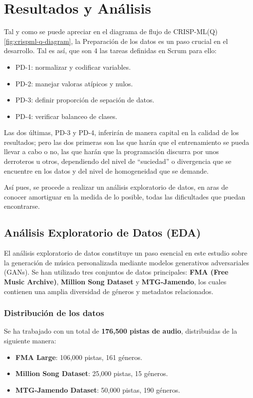\chapter{Resultados y Análisis}

Tal y como se puede apreciar en el diagrama de flujo de CRISP-ML(Q)\ref{fig:crispml-q-diagram}, la Preparación de los datos es un paso crucial en el desarrollo. Tal es así, que son 4 las tareas definidas en Scrum para ello:
\begin{itemize}
    \item PD-1: normalizar y codificar variables.
    \item PD-2: manejar valoras atípicos y nulos.
    \item PD-3: definir proporción de sepación de datos.
    \item PD-4: verificar balanceo de clases.
\end{itemize}

Las dos últimas, PD-3 y PD-4, inferirán de manera capital en la calidad de los resultados; pero las dos primeras son las que harán que el entrenamiento se pueda llevar a cabo o no, las que harán que la programación discurra por unos derroteros u otros, dependiendo del nivel de ``suciedad'' o divergencia que se encuentre en los datos y del nivel de homogeneidad que se demande.

Así pues, se procede a realizar un análisis exploratorio de datos, en aras de conocer amortiguar en la medida de lo posible, todas las dificultades que puedan encontrarse.

\section{Análisis Exploratorio de Datos (EDA)}

El análisis exploratorio de datos constituye un paso esencial en este estudio sobre la generación de música personalizada mediante modelos generativos adversariales (GANs). Se han utilizado tres conjuntos de datos principales: \textbf{FMA (Free Music Archive)}, \textbf{Million Song Dataset} y \textbf{MTG-Jamendo}, los cuales contienen una amplia diversidad de géneros y metadatos relacionados.

\subsection{Distribución de los datos}
Se ha trabajado con un total de \textbf{176,500 pistas de audio}, distribuidas de la siguiente manera:
\begin{itemize}
\item \textbf{FMA Large}: 106,000 pistas, 161 géneros.
\item \textbf{Million Song Dataset}: 25,000 pistas, 15 géneros.
\item \textbf{MTG-Jamendo Dataset}: 50,000 pistas, 190 géneros.
\end{itemize}

